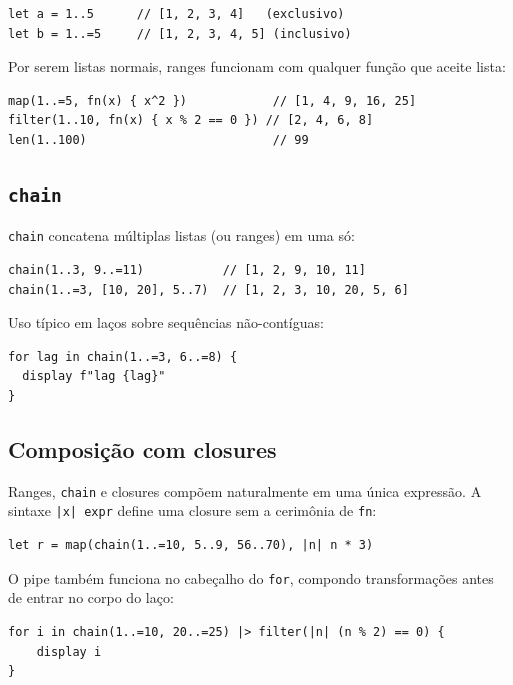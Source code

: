 \begin{lstlisting}[caption={Ranges como listas}]
let a = 1..5      // [1, 2, 3, 4]   (exclusivo)
let b = 1..=5     // [1, 2, 3, 4, 5] (inclusivo)
\end{lstlisting}

Por serem listas normais, ranges funcionam com qualquer função que aceite lista:

\begin{lstlisting}
map(1..=5, fn(x) { x^2 })            // [1, 4, 9, 16, 25]
filter(1..10, fn(x) { x % 2 == 0 }) // [2, 4, 6, 8]
len(1..100)                          // 99
\end{lstlisting}

\subsection{\texttt{chain}}

\lstinline{chain} concatena múltiplas listas (ou ranges) em uma só:

\begin{lstlisting}[caption={chain com ranges e listas}]
chain(1..3, 9..=11)           // [1, 2, 9, 10, 11]
chain(1..=3, [10, 20], 5..7)  // [1, 2, 3, 10, 20, 5, 6]
\end{lstlisting}

Uso típico em laços sobre sequências não-contíguas:

\begin{lstlisting}
for lag in chain(1..=3, 6..=8) {
  display f"lag {lag}"
}
\end{lstlisting}

\subsection{Composição com closures}

Ranges, \lstinline{chain} e closures compõem naturalmente em uma única expressão.
A sintaxe \lstinline{|x| expr} define uma closure sem a cerimônia de \lstinline{fn}:

\begin{lstlisting}[caption={Expressão composta — única linha}]
let r = map(chain(1..=10, 5..9, 56..70), |n| n * 3)
\end{lstlisting}

O pipe também funciona no cabeçalho do \lstinline{for}, compondo transformações
antes de entrar no corpo do laço:

\begin{lstlisting}[caption={Pipeline no cabeçalho do for}]
for i in chain(1..=10, 20..=25) |> filter(|n| (n % 2) == 0) {
    display i
}
\end{lstlisting}

